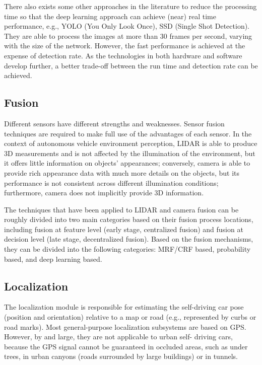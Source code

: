 There also exists some other approaches in the literature to reduce the
processing time so that the deep learning approach can achieve (near) real time
performance, e.g., YOLO (You Only Look Once), SSD (Single Shot Detection). They
are able to process the images at more than 30 frames per second, varying with
the size of the network. However, the fast performance is achieved at the
expense of detection rate. As the technologies in both hardware and software
develop further, a better trade-off between the run time and detection rate can
be achieved.

\subsection{Fusion}

Different sensors have different strengths and weaknesses. Sensor fusion
techniques are required to make full use of the advantages of each sensor. In
the context of autonomous vehicle environment perception, LIDAR is able to
produce 3D measurements and is not affected by the illumination of the
environment, but it offers little information on objects’ appearances;
conversely, camera is able to provide rich appearance data with much more
details on the objects, but its performance is not consistent across different
illumination conditions; furthermore, camera does not implicitly provide 3D
information.

The techniques that have been applied to LIDAR and camera fusion can be roughly
divided into two main categories based on their fusion process locations,
including fusion at feature level (early stage, centralized fusion) and fusion
at decision level (late stage, decentralized fusion). Based on the fusion
mechanisms, they can be divided into the following categories: MRF/CRF based,
probability based, and deep learning based.

\subsection{Localization}

The localization module is responsible for estimating the self-driving car pose
(position and orientation) relative to a map or road (e.g., represented by curbs
or road marks). Most general-purpose localization subsystems are based on GPS.
However, by and large, they are not applicable to urban self- driving cars,
because the GPS signal cannot be guaranteed in occluded areas, such as under
trees, in urban canyons (roads surrounded by large buildings) or in tunnels.


